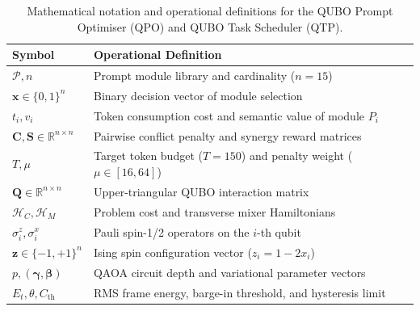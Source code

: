 \documentclass[review,12pt,times,authoryear]{elsarticle}
\theoremstyle{definition}
\begin{document}
\begin{table}[t]
\centering
\small
\setlength{\tabcolsep}{3.5pt}
\renewcommand{\arraystretch}{1.12}
\caption{Mathematical notation and operational definitions for the QUBO Prompt Optimiser (QPO) and QUBO Task Scheduler (QTP).}
\label{tab:notation}
\begin{tabularx}{\columnwidth}{|l|X|}
\hline
\textbf{Symbol} & \textbf{Operational Definition} \\
\hline
$\mathcal{P}, n$ & Prompt module library and cardinality ($n=15$) \\
\hline
$\bm{x} \in \{0, 1\}^n$ & Binary decision vector of module selection \\
\hline
$t_i, v_i$ & Token consumption cost and semantic value of module $P_i$ \\
\hline
$\mathbf{C}, \mathbf{S} \in \mathbb{R}^{n \times n}$ & Pairwise conflict penalty and synergy reward matrices \\
\hline
$T, \mu$ & Target token budget ($T=150$) and penalty weight ($\mu \in [16, 64]$) \\
\hline
$\mathbf{Q} \in \mathbb{R}^{n \times n}$ & Upper-triangular QUBO interaction matrix \\
\hline
$\mathcal{H}_C, \mathcal{H}_M$ & Problem cost and transverse mixer Hamiltonians \\
\hline
$\sigma_i^z, \sigma_i^x$ & Pauli spin-1/2 operators on the $i$-th qubit \\
\hline
$\bm{z} \in \{-1, +1\}^n$ & Ising spin configuration vector ($z_i = 1 - 2x_i$) \\
\hline
$p, (\bm{\gamma}, \bm{\beta})$ & QAOA circuit depth and variational parameter vectors \\
\hline
$E_t, \theta, C_{\mathrm{th}}$ & RMS frame energy, barge-in threshold, and hysteresis limit \\
\hline
\hline
\end{tabularx}\end{table}
\end{document}
